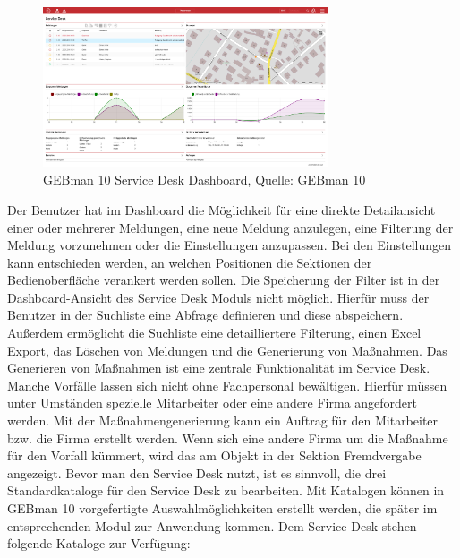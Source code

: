 \begin{figure}[h!]
\centering
	\includegraphics[width=0.75\textwidth]{Abbildungen/GEBman.png}
	\caption[GEBman 10 Service Desk Dashboard]{GEBman 10 Service Desk Dashboard, Quelle: 
	GEBman 10}
	\label{fig:GEBman10 Service Desk Dashboard}
\end{figure}

\noindent
Der Benutzer hat im Dashboard die Möglichkeit für eine direkte Detailansicht einer oder mehrerer Meldungen, eine neue Meldung anzulegen, eine Filterung der Meldung vorzunehmen oder die Einstellungen anzupassen. Bei den Einstellungen kann entschieden werden, an welchen Positionen die Sektionen der Bedienoberfläche verankert werden sollen.\newline
Die Speicherung der Filter ist in der Dashboard-Ansicht des Service Desk Moduls nicht möglich. Hierfür muss der Benutzer in der Suchliste eine Abfrage definieren und diese abspeichern. Außerdem ermöglicht die Suchliste eine detailliertere Filterung, einen Excel Export, das Löschen von Meldungen und die Generierung von Maßnahmen. Das Generieren von Maßnahmen ist eine zentrale Funktionalität im Service Desk. Manche Vorfälle lassen sich nicht ohne Fachpersonal bewältigen. Hierfür müssen unter Umständen spezielle Mitarbeiter oder eine andere Firma angefordert werden. Mit der Maßnahmengenerierung kann ein Auftrag für den Mitarbeiter bzw. die Firma erstellt werden. Wenn sich eine andere Firma um die Maßnahme für den Vorfall kümmert, wird das am Objekt in der Sektion Fremdvergabe angezeigt. \newline
Bevor man den Service Desk nutzt, ist es sinnvoll, die drei Standardkataloge für den Service Desk zu bearbeiten. Mit Katalogen können in GEBman 10  vorgefertigte Auswahlmöglichkeiten erstellt werden, die später im entsprechenden Modul zur Anwendung kommen. Dem Service Desk stehen folgende Kataloge zur Verfügung:\\

